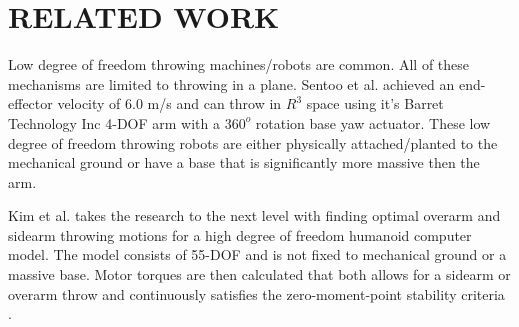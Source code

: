 \section{RELATED WORK}

Low degree of freedom throwing machines/robots are common.  
All of these mechanisms are limited to throwing in a plane.   
Sentoo et al.\cite{4651142} achieved an end-effector velocity of 6.0 m/s and can throw in $R^3$ space using it's Barret Technology Inc 4-DOF arm with a $360^o$ rotation base yaw actuator.  
These low degree of freedom throwing robots are either physically attached/planted to the mechanical ground or have a base that is significantly more massive then the arm.  

Kim et al. \cite{JooH2011438} takes the research to the next level with finding optimal overarm and sidearm throwing motions for a high degree of freedom humanoid computer model.  
The model consists of 55-DOF and is not fixed to mechanical ground or a massive base.  
Motor torques are then calculated that both allows for a sidearm or overarm throw and continuously satisfies the zero-moment-point stability criteria \cite{4309277}.  



